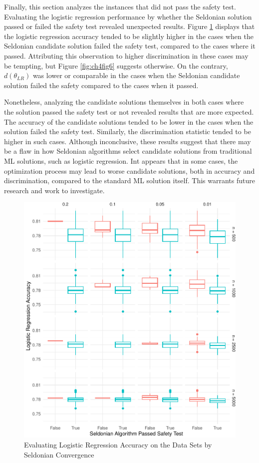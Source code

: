 \documentclass[12pt, twoside]{amherstthesis}
\begin{document}
Finally, this section analyzes the instances that did not pass the safety test. Evaluating the logistic regression performance by whether the Seldonian solution passed or failed the safety test revealed unexpected results. Figure \ref{fig:ch4fig5} displays that the logistic regression accuracy tended to be slightly higher in the cases when the Seldonian candidate solution failed the safety test, compared to the cases where it passed. Attributing this observation to higher discrimination in these cases may be tempting, but Figure \ref{fig:ch4fig6} suggests otherwise. On the contrary, \(d(\theta_{LR})\) was lower or comparable in the cases when the Seldonian candidate solution failed the safety compared to the cases when it passed.

Nonetheless, analyzing the candidate solutions themselves in both cases where the solution passed the safety test or not revealed results that are more expected. The accuracy of the candidate solutions tended to be lower in the cases when the solution failed the safety test. Similarly, the discrimination statistic tended to be higher in such cases. Although inconclusive, these results suggest that there may be a flaw in how Seldonian algorithms select candidate solutions from traditional ML solutions, such as logistic regression. Int appears that in some cases, the optimization process may lead to worse candidate solutions, both in accuracy and discrimination, compared to the standard ML solution itself. This warrants future research and work to investigate.
\begin{figure}

{\centering \includegraphics{Dasha-Asienga_StatThesis_files/figure-latex/ch4fig5-1} 

}

\caption{Evaluating Logistic Regression Accuracy on the Data Sets by Seldonian Convergence}\label{fig:ch4fig5}
\end{figure}
\end{document}
